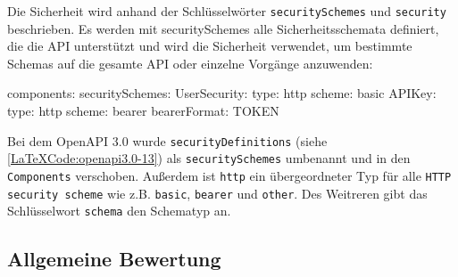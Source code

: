 Die Sicherheit wird anhand der Schlüsselwörter \texttt{securitySchemes} und \texttt{security} beschrieben. Es werden mit securitySchemes alle Sicherheitsschemata definiert, die die API unterstützt und wird die Sicherheit verwendet, um bestimmte Schemas auf die gesamte API oder einzelne Vorgänge anzuwenden\cite{openapisecurity17}: 

\begin{LaTeXCode}[caption={OpenAPI 3.0 - Security},captionpos=b, label=LaTeXCode:openapi3.0-13][numbers=none]
components:  
	securitySchemes:
		UserSecurity:
		  type: http
		  scheme: basic
		APIKey:
		  type: http
		  scheme: bearer
		  bearerFormat: TOKEN
\end{LaTeXCode}

Bei dem OpenAPI 3.0 wurde \texttt{securityDefinitions} (siehe \ref{LaTeXCode:openapi3.0-13}) als \texttt{securitySchemes} umbenannt und in den \texttt{Components} verschoben. Außerdem ist \texttt{http} ein übergeordneter Typ für alle \texttt{HTTP security scheme} wie z.B. \texttt{basic}, \texttt{bearer} und \texttt{other}. Des Weitreren gibt das Schlüsselwort \texttt{schema} den Schematyp an.

\subsection{Allgemeine Bewertung}



























